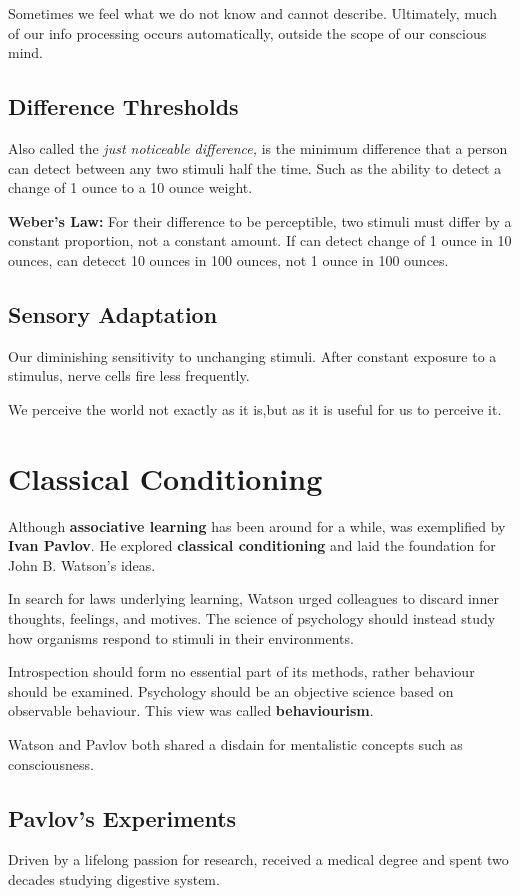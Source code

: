 \documentclass[12pt]{article}
\begin{document}
Sometimes we feel what we do not know and cannot describe. Ultimately, much of our info processing occurs automatically, outside the scope of our conscious mind.

\subsection{Difference Thresholds}
Also called the \textit{just noticeable difference,} is the minimum difference that a person can detect between any two stimuli half the time. Such as the ability to detect a change of 1 ounce to a 10 ounce weight. 

\textbf{Weber's Law:} For their difference to be perceptible, two stimuli must differ by a constant proportion, not a constant amount. If can detect change of 1 ounce in 10 ounces, can detecct 10 ounces in 100 ounces, not 1 ounce in 100 ounces.

\subsection*{Sensory Adaptation}
Our diminishing sensitivity to unchanging stimuli. After constant exposure to a stimulus, nerve cells fire less frequently. 

We perceive the world not exactly as it is,but as it is useful for us to perceive it. 

\section*{Classical Conditioning}
Although \textbf{associative learning} has been around for a while, was exemplified by \textbf{Ivan Pavlov}. He explored \textbf{classical conditioning} and laid the foundation for John B. Watson's ideas. 

In search for laws underlying learning, Watson urged colleagues to discard inner thoughts, feelings, and motives. The science of psychology should instead study how organisms respond to stimuli in their environments.

Introspection should form no essential part of its methods, rather behaviour should be examined. Psychology should be an objective science based on observable behaviour. This view was called \textbf{behaviourism}. 

Watson and Pavlov both shared a disdain for mentalistic concepts such as consciousness.

\subsection*{Pavlov's Experiments}
Driven by a lifelong passion for research, received a medical degree and spent two decades studying digestive system. 
\end{document}
